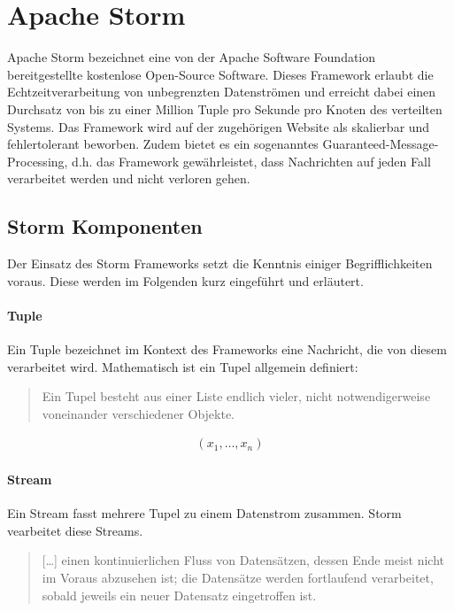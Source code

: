 \documentclass[a4paper,11pt]{scrartcl}
\begin{document}

  \section{Apache Storm}

  Apache Storm bezeichnet eine von der Apache Software Foundation
  bereitgestellte kostenlose Open-Source Software. Dieses Framework
  erlaubt die Echtzeitverarbeitung von unbegrenzten Datenströmen und
  erreicht dabei einen Durchsatz von bis zu einer Million Tuple pro
  Sekunde pro Knoten des verteilten Systems. Das Framework wird auf
  der zugehörigen Website als skalierbar und fehlertolerant beworben.
  Zudem bietet es ein sogenanntes Guaranteed-Message-Processing, d.h.
  das Framework gewährleistet, dass Nachrichten auf jeden Fall
  verarbeitet werden und nicht verloren gehen.

  \subsection{Storm Komponenten}

  Der Einsatz des Storm Frameworks setzt die Kenntnis einiger
  Begrifflichkeiten voraus. Diese werden im Folgenden kurz eingeführt
  und erläutert.

  \paragraph{Tuple}
  Ein Tuple bezeichnet im Kontext des Frameworks eine Nachricht, die
  von diesem verarbeitet wird. Mathematisch ist ein Tupel allgemein
  definiert:
  \begin{quote}
    Ein Tupel besteht aus einer Liste endlich vieler, nicht
    notwendigerweise voneinander verschiedener Objekte.
  \end{quote}

  \begin{align*}
    (x_1, \ldots , x_n)
  \end{align*}

  \paragraph{Stream}
  Ein Stream fasst mehrere Tupel zu einem Datenstrom zusammen. Storm
  vearbeitet diese Streams.
  \begin{quote}
    [\ldots] einen kontinuierlichen Fluss von Datensätzen, dessen Ende
    meist nicht im Voraus abzusehen ist; die Datensätze werden
    fortlaufend verarbeitet, sobald jeweils ein neuer Datensatz
    eingetroffen ist.
  \end{quote}
\end{document}
